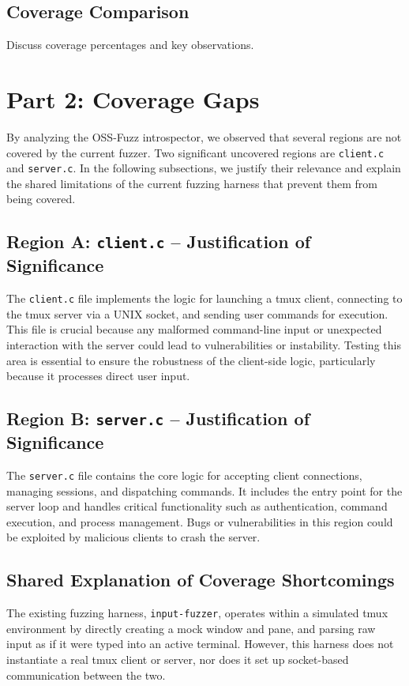 \documentclass[11pt,a4paper,twocolumn]{article}
\begin{document}
\subsection{Coverage Comparison}
Discuss coverage percentages and key observations.

\section{Part 2: Coverage Gaps}
By analyzing the OSS-Fuzz introspector, we observed that several regions are not covered by the current fuzzer. Two significant uncovered regions are \texttt{client.c} and \texttt{server.c}. In the following subsections, we justify their relevance and explain the shared limitations of the current fuzzing harness that prevent them from being covered.

\subsection{Region A: \texttt{client.c} – Justification of Significance}
The \texttt{client.c} file implements the logic for launching a tmux client, connecting to the tmux server via a UNIX socket, and sending user commands for execution. This file is crucial because any malformed command-line input or unexpected interaction with the server could lead to vulnerabilities or instability. Testing this area is essential to ensure the robustness of the client-side logic, particularly because it processes direct user input.

\subsection{Region B: \texttt{server.c} – Justification of Significance}
The \texttt{server.c} file contains the core logic for accepting client connections, managing sessions, and dispatching commands. It includes the entry point for the server loop and handles critical functionality such as authentication, command execution, and process management. Bugs or vulnerabilities in this region could be exploited by malicious clients to crash the server.

\subsection*{Shared Explanation of Coverage Shortcomings}
The existing fuzzing harness, \texttt{input-fuzzer}, operates within a simulated tmux environment by directly creating a mock window and pane, and parsing raw input as if it were typed into an active terminal. However, this harness does not instantiate a real tmux client or server, nor does it set up socket-based communication between the two.
\end{document}
